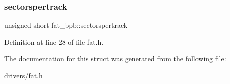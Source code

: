 \subsubsection{\texorpdfstring{sectorspertrack}{sectorspertrack}}
{\footnotesize\ttfamily unsigned short fat\+\_\+bpb\+::sectorspertrack}



Definition at line 28 of file fat.\+h.



The documentation for this struct was generated from the following file\+:\begin{DoxyCompactItemize}
\item 
drivers/\hyperlink{fat_8h}{fat.\+h}\end{DoxyCompactItemize}
